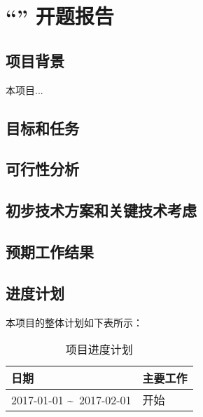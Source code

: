 \chapter*{``\zjutitlec'' 开题报告}

\section{项目背景}

本项目\cite{article1, article2}...

\section{目标和任务}

\section{可行性分析}

\section{初步技术方案和关键技术考虑}

\section{预期工作结果}

\section{进度计划}

本项目的整体计划如下表所示：

\begin{table}[!htbp]
\centering
\begin{tabular}{|l|l|}
\hline
日期 & 主要工作 \\ \hline
2017-01-01 \textasciitilde\ 2017-02-01 & 开始 \\ \hline
\end{tabular}
\caption{项目进度计划}
\label{table:schedule}
\end{table}


{
\renewcommand{\chapter}[2]{\section*{#2}\addcontentsline{toc}{section}{#2}}

}

